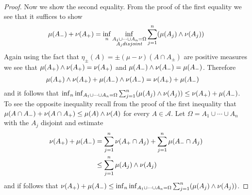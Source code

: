 \begin{proof}
Now we show the second equality.  From the proof of the first equality we see that it suffices to show
\begin{align*}
\mu(A_-) + \nu(A_+) = \inf_n \inf_{\substack{A_1 \cup \dotsb \cup A_n = \Omega \\ \text{$A_j$} disjoint}} \sum_{j=1}^n (\mu(A_j) \wedge \nu(A_j))
\end{align*}
Again using the fact that $\eta_\pm(A) = \pm (\mu - \nu)(A \cap A_\pm)$ are positive measures we see that $\mu(A_+) \wedge \nu(A_+) = \nu(A_+)$
and $\mu(A_-) \wedge \nu(A_-) = \mu(A_-)$.  Therefore 
\begin{align*}
\mu(A_+) \wedge \nu(A_+)  + \mu(A_-) \wedge \nu(A_-) &= \nu(A_+) + \mu(A_-) 
\end{align*}
and it follows that $\inf_n \inf_{A_1 \cup \dotsb \cup A_n = \Omega} \sum_{j=1}^n (\mu(A_j) \wedge \nu(A_j)) \leq \nu(A_+) + \mu(A_-) $.  To see the opposite inequality
recall from the proof of the first inequality that $\mu(A \cap A_-) + \nu(A \cap A_+)  \leq \mu(A) \wedge \nu(A)$ for every $A \in \mathcal{A}$. 
Let $\Omega = A_1 \cup \dotsb \cup A_n$ with the $A_j$ disjoint and estimate
\begin{align*}
\nu(A_+) + \mu(A_-) &= \sum_{j=1}^n \nu(A_+ \cap A_j) + \sum_{j=1}^n \mu(A_- \cap A_j)  \\
&\leq \sum_{j=1}^n \mu(A_j) \wedge \nu(A_j) 
\end{align*}
and if follows that $\nu(A_+) + \mu(A_-) \leq \inf_n \inf_{A_1 \cup \dotsb \cup A_n = \Omega} \sum_{j=1}^n (\mu(A_j) \wedge \nu(A_j))$.
\end{proof}

